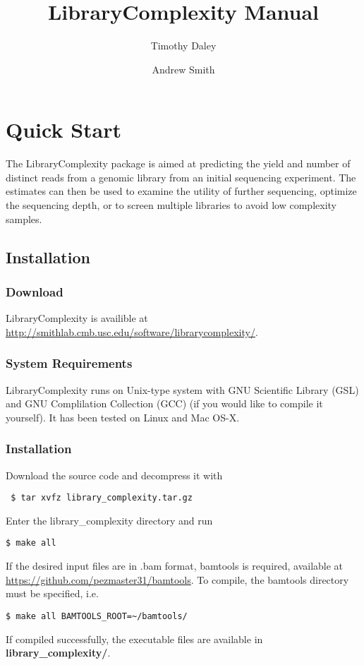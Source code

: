 \documentclass[11pt]{report}
\title{LibraryComplexity Manual}
\author{Timothy Daley \and Andrew Smith}
\begin{document}
\maketitle

\chapter{Quick Start}
\label{chap:quickstart}

The LibraryComplexity package is aimed at predicting
the yield and number of distinct reads from a genomic library
from an initial sequencing experiment.  The estimates
can then be used to examine the utility of further
sequencing, optimize the sequencing depth,
or to screen multiple libraries to avoid low complexity
samples.

\section{Installation}
\label{sec:install}

\subsection{Download}
\label{sub:download}

LibraryComplexity is availible at
\url{http://smithlab.cmb.usc.edu/software/librarycomplexity/}.

\subsection{System Requirements}
\label{sub:require}

LibraryComplexity runs on Unix-type system
with GNU Scientific Library (GSL) and
GNU Complilation Collection (GCC) (if you would like to compile it
yourself).  It has been tested on Linux and 
Mac OS-X.

\subsection{Installation}
\label{sub:install}

Download the source code and decompress
it with 
\begin{verbatim}
 $ tar xvfz library_complexity.tar.gz
\end{verbatim}
% 
Enter the library\_complexity directory and run
\begin{verbatim}
$ make all
\end{verbatim}
If the desired input files are in .bam format, bamtools is required, 
available at \url{https://github.com/pezmaster31/bamtools}.  
To compile, the bamtools directory must be specified, i.e.
\begin{verbatim}
$ make all BAMTOOLS_ROOT=~/bamtools/
\end{verbatim}
If compiled successfully, the executable files are available
in \textbf{library\_complexity/}.
\end{document}

